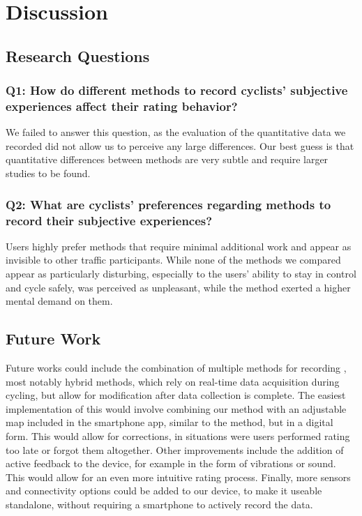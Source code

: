 \section{Discussion}\label{sec:discussion}


\subsection{Research Questions}

\subsubsection{Q1: How do different methods to record cyclists' subjective experiences affect their
rating behavior?}

We failed to answer this question, as the evaluation of the quantitative data we recorded did not allow us to perceive any large differences.
Our best guess is that quantitative differences between methods are very subtle and require larger studies to be found.

\subsubsection{Q2: What are cyclists' preferences regarding methods to record their subjective experiences?}

Users highly prefer methods that require minimal additional work and appear as invisible to other traffic participants.
While none of the methods we compared appear as particularly disturbing, especially to the users' ability to stay in control and cycle safely, \audiorecording was perceived as unpleasant, while the \mapping method exerted a higher mental demand on them.

\subsection{Future Work}

Future works could include the combination of multiple methods for recording \CSE, most notably hybrid methods, which rely on real-time data acquisition during cycling, but allow for modification after data collection is complete.
The easiest implementation of this would involve combining our \likertshift method with an adjustable map included in the smartphone app, similar to the \mapping method, but in a digital form.
This would allow for corrections, in situations were users performed rating too late or forgot them altogether.
Other improvements include the addition of active feedback to the device, for example in the form of vibrations or sound.
This would allow for an even more intuitive rating process.
Finally, more sensors and connectivity options could be added to our \likertshift device, to make it useable standalone, without requiring a smartphone to actively record the data.
